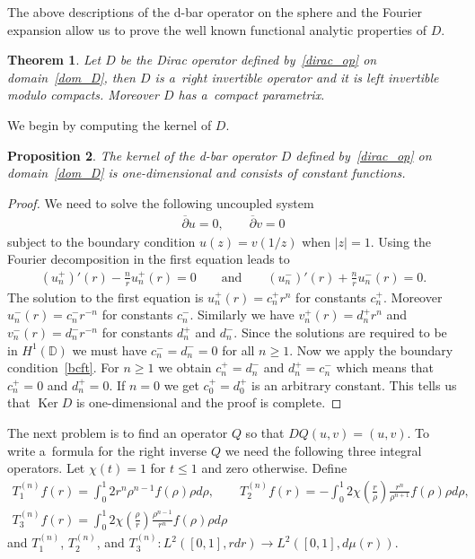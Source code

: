 \documentclass[11pt]{article}
\numberwithin{equation}{section}
\newtheorem{theo}{Theorem}[section]
\newtheorem{prop}[theo]{Proposition}
{\theoremstyle{definition}
\newtheorem{rem}[theo]{Remark}
\newtheorem{defin}[theo]{Definition}
}
\DeclareMathOperator{\Ker}{Ker}
\begin{document}
The above descriptions of the d-bar operator on the sphere and the Fourier expansion allow us to prove the well known
functional analytic properties of $D$.

\begin{theo}\label{compact_para_cont}
Let $D$ be the Dirac operator defined by~\eqref{dirac_op} on domain~\eqref{dom_D}, then $D$ is a~right invertible
operator and it is left invertible modulo compacts.
Moreover $D$ has a~compact parametrix.
\end{theo}

We begin by computing the kernel of $D$.

\begin{prop}
The kernel of the d-bar operator $D$ defined by~\eqref{dirac_op} on domain~\eqref{dom_D} is one-dimensional and consists
of constant functions.
\end{prop}

\begin{proof}
We need to solve the following uncoupled system
\begin{gather*}
\overline{\partial}u = 0,
\qquad
\overline{\partial}v = 0
\end{gather*}
subject to the boundary condition $u(z)=v(1/z)$ when $|z|=1$.
Using the Fourier decomposition in the f\/irst equation leads to
\begin{gather*}
(u_n^+)'(r) - \frac{n}{r} u_n^+(r) = 0
\qquad
\textrm{and}
\qquad
(u_n^-)'(r) + \frac{n}{r} u_n^-(r) = 0.
\end{gather*}
The solution to the f\/irst equation is $u_n^+(r) = c_n^+ r^n$ for constants $c_n^+$.
Moreover $u_n^-(r) = c_n^-r^{-n}$ for constants $c_n^-$.
Similarly we have $v_n^+(r) = d_n^+r^n$ and $v_n^-(r) = d_n^-r^{-n}$ for constants $d_n^+$ and $d_n^-$.
Since the solutions are required to be in $H^1({\mathbb D})$ we must have $c_n^- = d_n^- = 0$ for all $n\ge 1$.
Now we apply the boundary condition~\eqref{bcft}.
For $n\ge1$ we obtain $c_n^+ = d_n^-$ and $d_n^+ = c_n^-$ which means that $c_n^+ = 0$ and $d_n^+ = 0$.
If $n=0$ we get $c_0^+=d_0^+$ is an arbitrary constant.
This tells us that $\Ker D$ is one-dimensional and the proof is complete.
\end{proof}

The next problem is to f\/ind an operator $Q$ so that $DQ(u,v)=(u,v)$.
To write a~formula for the right inverse $Q$ we need the following three integral operators.
Let $\chi(t)=1$ for $t\le1$ and zero otherwise.
Def\/ine
\begin{gather}
T_1^{(n)}f(r) = \int_0^1 2r^n\rho^{n-1}f(\rho)\rho d\rho,
\qquad
T_2^{(n)}f(r) = -\int_0^1 2\chi\left(\frac{r}{\rho}\right)\frac{r^n}{\rho^{n+1}}f(\rho)\rho d\rho,
\nonumber
\\
T_3^{(n)}f(r) = \int_0^1 2\chi\left(\frac{\rho}{r}\right)\frac{\rho^{n-1}}{r^n}f(\rho)\rho d\rho
\label{int_ops_cont}
\end{gather}
and $T_1^{(n)}$, $T_2^{(n)}$, and $T_3^{(n)}: L^2([0,1], rdr)\to L^2([0,1], d\mu(r))$.
\end{document}
